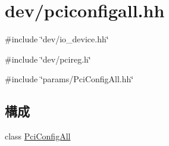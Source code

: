\hypertarget{pciconfigall_8hh}{
\section{dev/pciconfigall.hh}
\label{pciconfigall_8hh}
}
{\ttfamily \#include \char`\"{}dev/io\_\-device.hh\char`\"{}}\par
{\ttfamily \#include \char`\"{}dev/pcireg.h\char`\"{}}\par
{\ttfamily \#include \char`\"{}params/PciConfigAll.hh\char`\"{}}\par
\subsection*{構成}
\begin{DoxyCompactItemize}
\item 
class \hyperlink{classPciConfigAll}{PciConfigAll}
\end{DoxyCompactItemize}
